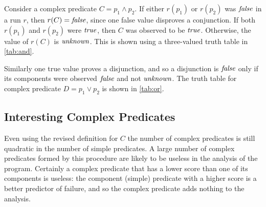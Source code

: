 Consider a complex predicate $C = p_1 \wedge p_2$.  If either $r(p_1)$ or $r(p_2)$ was $\mathit{false}$ in a run $r$, then $r(C) = \mathit{false}$, since one false value disproves a conjunction.  If both $r(p_1)$ and $r(p_2)$ were $\mathit{true}$, then $C$ was observed to be $\mathit{true}$.  Otherwise, the value of $r(C)$ is $\mathit{unknown}$. This is shown using a three-valued truth table in \autoref{tab:and}.

Similarly one true value proves a disjunction, and so a disjunction is $\mathit{false}$ only if its components were observed $\mathit{false}$ and not $\mathit{unknown}$.  The truth table for complex predicate $D = p_1 \vee p_2$ is shown in \autoref{tab:or}.

\begin{table}
  \caption{Three-valued truth tables for complex predicates}
  \label{tab:truth-tables}
  \hfill
  \hfill
  \hspace*{\fill}
\end{table}

\subsection{Interesting Complex Predicates}
Even using the revised definition for $C$ the number of complex predicates is still quadratic in the number of simple predicates.  A large number of complex predicates formed by this procedure are likely to be useless in the analysis of the program.  Certainly a complex predicate that has a lower score than one of its components is useless: the component (simple) predicate with a higher score is a better predictor of failure, and so the complex predicate adds nothing to the analysis.

